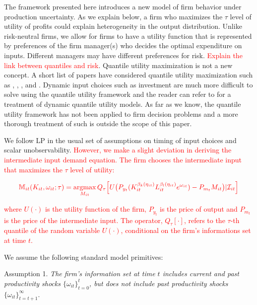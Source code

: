 \documentclass[11pt]{article}
\begin{document}
The framework presented here introduces a new model of firm behavior under production uncertainty. As we explain below, a firm who maximizes the $\tau$ level of utility of profits could explain heterogeneity in the output distribution. Unlike risk-neutral firms, we allow for firms to have a utility function that is represented by preferences of the firm manager(s) who decides the optimal expenditure on inputs. Different managers may have different preferences for risk. \textcolor{red}{Explain the link between quantiles and risk}. Quantile utility maximization is not a new concept. A short list of papers have considered quantile utility maximization such as \cite{Manski1988}, \cite{ROSTEK2009}, \cite{Chambers2007}, and \cite{Bhattacharya2009}. Dynamic input choices such as investment are much more difficult to solve using the quantile utility framework and the reader can refer to \cite{Castro2017} for a treatment of dynamic quantile utility models. As far as we know, the quantile utility framework has not been applied to firm decision problems and a more thorough treatment of such is outside the scope of this paper.



We follow LP in the usual set of assumptions on timing of input choices and scalar unobservability. \textcolor{red}{However, we make a slight deviation in deriving the intermediate input demand equation. The firm chooses the intermediate input that maximizes the $\tau$ level of utility:}

\begin{equation} \label{qmaxinput}
\textcolor{red}{\mathbb{M}_{it}(K_{it}, \omega_{it}; \tau)=\underset{M_{it}}{\operatorname{argmax}}\,Q_{\tau}\Big[U\big(P_{y_{t}}(K_{it}^{\beta_{k}(\eta_{it})}L_{it}^{\beta_{l}(\eta_{it})}e^{\omega_{it}})-P_{m_{t}}M_{it}\big)|\mathcal{I}_{it}\Big]}
\end{equation}

\textcolor{red}{where $U(\cdot)$ is the utility function of the firm, $P_{y_{t}}$ is the price of output and $P_{m_{t}}$ is the price of the intermediate input. The operator, $Q_{\tau}[\cdot]$, refers to the $\tau$-th quantile of the random variable $U(\cdot)$, conditional on the firm's informations set at time $t$.} 

We assume the following standard model primitives:

Assumption 1. \textit{The firm's information set at time $t$ includes current and past productivity shocks $\{\omega_{it}\}_{t=0}^{t}$, but does not include past productivity shocks} $\{\omega_{it}\}_{t=t+1}^{\infty}$.
\end{document}
